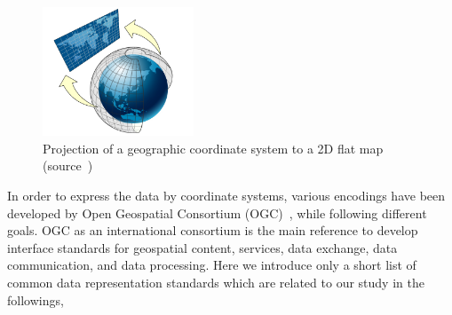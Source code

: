\documentclass[a4paper,12pt]{article}
\begin{document}
\begin{figure}
\centering
\includegraphics[width=0.4\textwidth]{sphere_to_cylinder}
\caption{Projection of a geographic coordinate system to a 2D flat map (source~\cite{projected})}
\label{figproject}
\end{figure}

In order to express the data by coordinate systems, various encodings have been developed by Open Geospatial Consortium (OGC)~\cite{ogc}, while following different goals. OGC as an international consortium is the main reference to develop interface standards for geospatial content, services, data exchange, data communication, and data processing. Here we introduce only a short list of common data representation standards which are related to our study in the followings,
\end{document}
